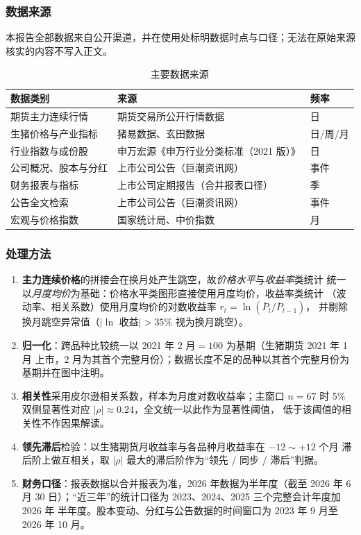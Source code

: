 \subsubsection{数据来源}

本报告全部数据来自公开渠道，并在使用处标明数据时点与口径；无法在原始来源核实的内容不写入正文。

\begin{table}[htbp]
\centering
\small
\caption{主要数据来源}
\label{tab:data-source}
\begin{tabularx}{\textwidth}{@{}l X l@{}}
\toprule
\textbf{数据类别} & \textbf{来源} & \textbf{频率} \\
\midrule
期货主力连续行情 & 期货交易所公开行情数据 & 日 \\
生猪价格与产业指标 & 猪易数据、玄田数据 & 日/周/月 \\
行业指数与成份股 & 申万宏源《申万行业分类标准（2021 版）》 & 日 \\
公司概况、股本与分红 & 上市公司公告（巨潮资讯网） & 事件 \\
财务报表与指标 & 上市公司定期报告（合并报表口径） & 季 \\
公告全文检索 & 上市公司公告（巨潮资讯网） & 事件 \\
宏观与价格指数 & 国家统计局、中价指数 & 月 \\
\bottomrule
\end{tabularx}
\end{table}

\subsubsection{处理方法}

\begin{enumerate}
  \item \textbf{主力连续价格}的拼接会在换月处产生跳空，故\emph{价格水平}与\emph{收益率}类统计
  统一以\emph{月度均价}为基础：价格水平类图形直接使用月度均价，收益率类统计
  （波动率、相关系数）使用月度均价的对数收益率 $r_t=\ln(\bar{P}_t/\bar{P}_{t-1})$，
  并剔除换月跳空异常值（$|\ln$ 收益$|>35\%$ 视为换月跳空）。
  \item \textbf{归一化}：跨品种比较统一以 2021 年 2 月$=100$ 为基期（生猪期货 2021 年 1 月
  上市，2 月为其首个完整月份）；数据长度不足的品种以其首个完整月份为基期并在图中注明。
  \item \textbf{相关性}采用皮尔逊相关系数，样本为月度对数收益率；主窗口 $n=67$ 时
  5\% 双侧显著性对应 $|\rho|\approx0.24$，全文统一以此作为显著性阈值，
  低于该阈值的相关性不作因果解读。
  \item \textbf{领先滞后}检验：以生猪期货月收益率与各品种月收益率在 $-12\sim+12$ 个月
  滞后阶上做互相关，取 $|\rho|$ 最大的滞后阶作为“领先 / 同步 / 滞后”判据。
  \item \textbf{财务口径}：报表数据以合并报表为准，2026 年数据为半年度（截至 2026 年
  6 月 30 日）；“近三年”的统计口径为 2023、2024、2025 三个完整会计年度加 2026 年
  半年度。股本变动、分红与公告数据的时间窗口为 2023 年 9 月至 2026 年 10 月。
\end{enumerate}

